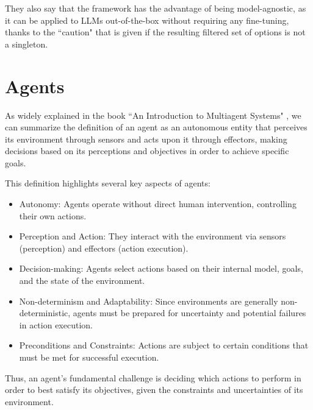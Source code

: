 They also say that the framework has the advantage of being model-agnostic, as it
can be applied to LLMs out-of-the-box without requiring any fine-tuning, thanks
to the ``caution" that is given if the resulting filtered set of options is not a
singleton.

\section{Agents}
\label{sec:agents}


As widely explained in the book ``An Introduction to Multiagent Systems"
\cite{wooldridge2002multiagent}, we can summarize the definition of an agent as an
autonomous entity that perceives its environment through sensors and acts upon it
through effectors, making decisions based on its perceptions and objectives in
order to achieve specific goals.

This definition highlights several key aspects of agents:
\begin{itemize}
  \item Autonomy: Agents operate without direct human intervention, controlling their
    own actions.

  \item Perception and Action: They interact with the environment via sensors (perception)
    and effectors (action execution).

  \item Decision-making: Agents select actions based on their internal model, goals,
    and the state of the environment.

  \item Non-determinism and Adaptability: Since environments are generally non-deterministic,
    agents must be prepared for uncertainty and potential failures in action execution.

  \item Preconditions and Constraints: Actions are subject to certain conditions
    that must be met for successful execution.
\end{itemize}

Thus, an agent's fundamental challenge is deciding which actions to perform in order
to best satisfy its objectives, given the constraints and uncertainties of its
environment.

